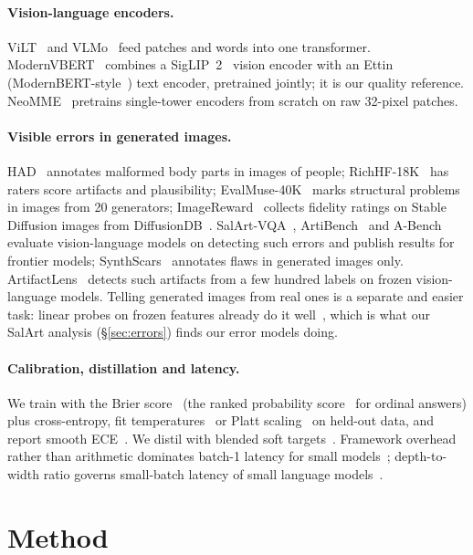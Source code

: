 \documentclass[10pt]{article}
\begin{document}
\paragraph{Vision-language encoders.} ViLT~\cite{vilt} and VLMo~\cite{vlmo} feed patches and words into one transformer. ModernVBERT~\cite{modernvbert2025} combines a SigLIP~2~\cite{siglip2} vision encoder with an Ettin~\cite{ettin} (ModernBERT-style~\cite{modernbert}) text encoder, pretrained jointly; it is our quality reference. NeoMME~\cite{neomme} pretrains single-tower encoders from scratch on raw 32-pixel patches.
\paragraph{Visible errors in generated images.} HAD~\cite{hadm2024} annotates malformed body parts in images of people; RichHF-18K~\cite{richhf2024} has raters score artifacts and plausibility; EvalMuse-40K~\cite{evalmuse2024} marks structural problems in images from 20 generators; ImageReward~\cite{imagereward2023} collects fidelity ratings on Stable Diffusion images from DiffusionDB~\cite{diffusiondb2023}. SalArt-VQA~\cite{salart2026}, ArtiBench~\cite{artibench2026} and A-Bench~\cite{abench2024} evaluate vision-language models on detecting such errors and publish results for frontier models; SynthScars~\cite{legion2025} annotates flaws in generated images only. ArtifactLens~\cite{artifactlens2026} detects such artifacts from a few hundred labels on frozen vision-language models. Telling generated images from real ones is a separate and easier task: linear probes on frozen features already do it well~\cite{wang2020cnn,univfd2023}, which is what our SalArt analysis (\S\ref{sec:errors}) finds our error models doing.
\paragraph{Calibration, distillation and latency.} We train with the Brier score~\cite{brier1950} (the ranked probability score~\cite{epstein1969} for ordinal answers) plus cross-entropy, fit temperatures~\cite{guo2017} or Platt scaling~\cite{platt1999} on held-out data, and report smooth ECE~\cite{smece}. We distil with blended soft targets~\cite{hinton2015}. Framework overhead rather than arithmetic dominates batch-1 latency for small models~\cite{frameworktax}; depth-to-width ratio governs small-batch latency of small language models~\cite{nemotronflash2025}.

\section{Method}\label{sec:method}
\end{document}
